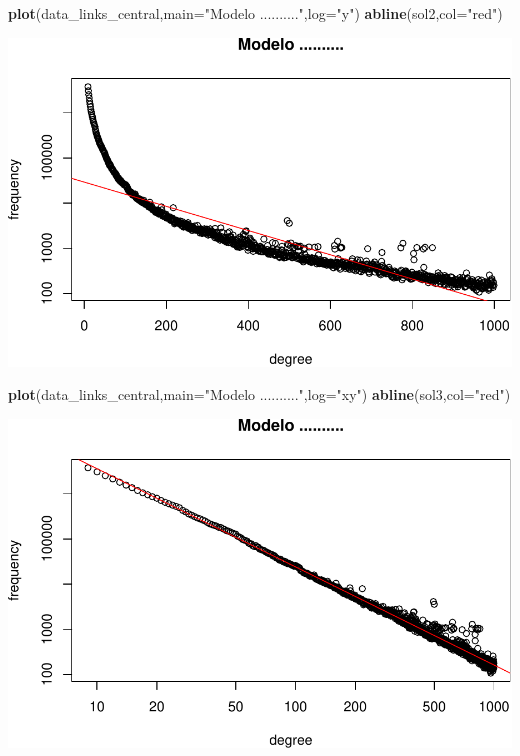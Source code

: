 \documentclass[
]{article}
\newenvironment{Shaded}{\begin{snugshade}}{\end{snugshade}}
\newcommand{\DataTypeTok}[1]{\textcolor[rgb]{0.13,0.29,0.53}{#1}}
\newcommand{\KeywordTok}[1]{\textcolor[rgb]{0.13,0.29,0.53}{\textbf{#1}}}
\newcommand{\NormalTok}[1]{#1}
\newcommand{\StringTok}[1]{\textcolor[rgb]{0.31,0.60,0.02}{#1}}
\begin{document}
\begin{Shaded}
\begin{Highlighting}[]
\KeywordTok{plot}\NormalTok{(data\_links\_central,}\DataTypeTok{main=}\StringTok{"Modelo .........."}\NormalTok{,}\DataTypeTok{log=}\StringTok{"y"}\NormalTok{)}
\KeywordTok{abline}\NormalTok{(sol2,}\DataTypeTok{col=}\StringTok{"red"}\NormalTok{)}
\end{Highlighting}
\end{Shaded}

\includegraphics{taller_problemas_resueltos_extra_1_files/figure-latex/unnamed-chunk-53-2.pdf}

\begin{Shaded}
\begin{Highlighting}[]
\KeywordTok{plot}\NormalTok{(data\_links\_central,}\DataTypeTok{main=}\StringTok{"Modelo .........."}\NormalTok{,}\DataTypeTok{log=}\StringTok{"xy"}\NormalTok{)}
\KeywordTok{abline}\NormalTok{(sol3,}\DataTypeTok{col=}\StringTok{"red"}\NormalTok{)}
\end{Highlighting}
\end{Shaded}

\includegraphics{taller_problemas_resueltos_extra_1_files/figure-latex/unnamed-chunk-53-3.pdf}
\end{document}
